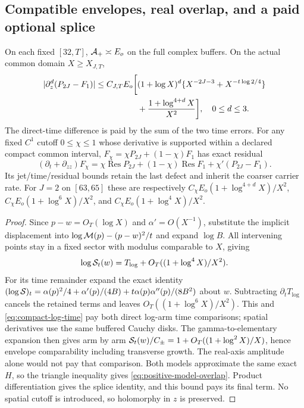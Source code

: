 \subsection{Compatible envelopes, real overlap, and a paid optional splice}
\begin{proposition}
\label{prop:positive-overlap-splice}
On each fixed $[32,T]$, $\mathcal A_+\asymp E_o$ on the full complex
buffers. On the actual common domain $X\ge X_{J,T}$,
\begin{align}
 |\partial_z^d(P_{2J}-F_1)|\le C_{J,T}E_o\bigg[&
 (1+\log X)^d\{X^{-2J-3}+X^{-t\log2/4}\}\notag\\
 &+\frac{1+\log^{4+d}X}{X^2}\bigg],\quad0\le d\le3.
 \label{eq:positive-model-overlap}
\end{align}
The direct-time difference is paid by the sum of the two time errors.
For any fixed $C^1$ cutoff $0\le\chi\le1$ whose derivative is
supported within a declared compact common interval,
$F_\chi=\chi P_{2J}+(1-\chi)F_1$ has exact residual
\begin{equation}
 (\partial_t+\partial_{zz})F_\chi
 =\chi\operatorname{Res}P_{2J}+(1-\chi)\operatorname{Res}F_1
                         +\chi'(P_{2J}-F_1).
 \label{eq:positive-paid-splice}
\end{equation}
Its jet/time/residual bounds retain the last defect and inherit the
coarser carrier rate. For $J=2$ on $[63,65]$ these are respectively
$C_\chi E_o(1+\log^{4+d}X)/X^2$,
$C_\chi E_o(1+\log^6X)/X^2$, and
$C_\chi E_o(1+\log^4X)/X^2$.
\end{proposition}
\begin{proof}
Since $p-w=O_T(\log X)$ and $\alpha'=O(X^{-1})$, substitute the
implicit displacement into $\log\mathcal M(p)-(p-w)^2/t$ and expand
$\log B$. All intervening points stay in a fixed sector with modulus
comparable to $X$, giving
\[
 \log\mathcal S_t(w)=T_{\log}+O_T((1+\log^4X)/X^2).
\]
For its time remainder expand the exact identity
$(\log\mathcal S)_t=\alpha(p)^2/4+\alpha'(p)/(4B)
+t\alpha(p)\alpha''(p)/(8B^2)$ about $w$. Subtracting
$\partial_tT_{\log}$ cancels the retained terms and leaves
$O_T((1+\log^6X)/X^2)$. This and
\eqref{eq:compact-log-time} pay both direct log-arm time comparisons;
spatial derivatives use the same buffered Cauchy disks.
The gamma-to-elementary expansion then gives arm by arm
$\mathcal S_t(w)/C_\pm=1+O_T((1+\log^2X)/X)$, hence envelope
comparability including transverse growth. The real-axis amplitude
alone would not pay that comparison. Both models approximate the
same exact $H$, so the triangle inequality gives
\eqref{eq:positive-model-overlap}. Product differentiation gives the
splice identity, and this bound pays its final term. No spatial cutoff
is introduced, so holomorphy in $z$ is preserved.
\end{proof}

